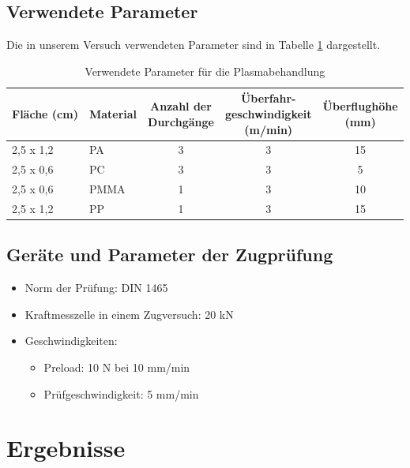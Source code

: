\documentclass[a4paper,12pt]{article}
\begin{document}
\subsection{Verwendete Parameter}
Die in unserem Versuch verwendeten Parameter sind in Tabelle \ref{tab:plasmabehandlung} dargestellt.

\begin{table}[h]
    \centering
    \caption{Verwendete Parameter für die Plasmabehandlung}
    \label{tab:plasmabehandlung}
    \renewcommand{\arraystretch}{1.2} %
    \begin{tabularx}{\textwidth}{l X c c c}
        \toprule
        \textbf{Fläche (cm)} & \textbf{Material} & \makecell{\textbf{Anzahl der} \\ \textbf{Durchgänge}} & \makecell{\textbf{Überfahr-} \\ \textbf{geschwindigkeit} \\ \textbf{(m/min)}} & \makecell{\textbf{Überflughöhe} \\ \textbf{(mm)}} \\
        \midrule
        2,5 x 1,2 & PA & 3 & 3 & 15 \\
        2,5 x 0,6 & PC & 3 & 3 & 5 \\
        2,5 x 0,6 & PMMA & 1 & 3 & 10 \\
        2,5 x 1,2 & PP & 1 & 3 & 15 \\
        \bottomrule
    \end{tabularx}
\end{table}

\subsection{Geräte und Parameter der Zugprüfung}

\begin{itemize}
    \item Norm der Prüfung: DIN 1465
    \item Kraftmesszelle in einem Zugversuch: 20 kN
    \item Geschwindigkeiten:
    \begin{itemize}
        \item Preload: 10 N bei 10 mm/min
        \item Prüfgeschwindigkeit: 5 mm/min
    \end{itemize}
\end{itemize}



\section{Ergebnisse}
\end{document}
